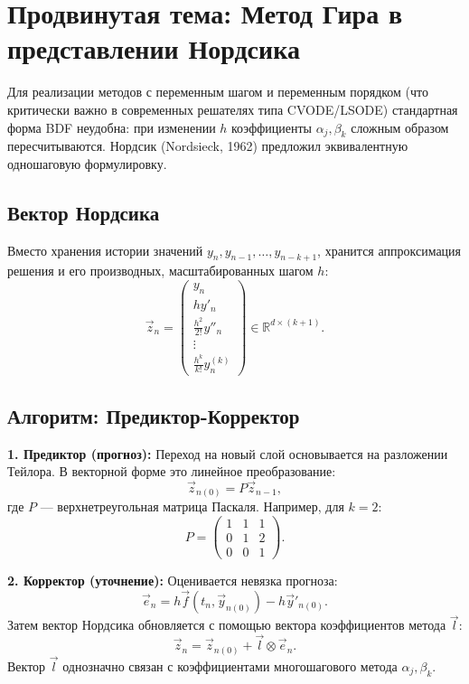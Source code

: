 \documentclass[12pt,a4paper]{article}
\begin{document}
\section{Продвинутая тема: Метод Гира в представлении Нордсика}

Для реализации методов с переменным шагом и переменным порядком (что критически важно в современных решателях типа CVODE/LSODE) стандартная форма BDF неудобна: при изменении $h$ коэффициенты $\alpha_j, \beta_k$ сложным образом пересчитываются. Нордсик (Nordsieck, 1962) предложил эквивалентную одношаговую формулировку.

\subsection{Вектор Нордсика}
Вместо хранения истории значений $y_n, y_{n-1}, \dots, y_{n-k+1}$, хранится аппроксимация решения и его производных, масштабированных шагом $h$:
\begin{equation}
    \vec{z}_n = \begin{pmatrix} y_n \\ h y'_n \\ \frac{h^2}{2!} y''_n \\ \vdots \\ \frac{h^k}{k!} y^{(k)}_n \end{pmatrix} \in \mathbb{R}^{d \times (k+1)}.
\end{equation}

\subsection{Алгоритм: Предиктор-Корректор}
\textbf{1. Предиктор (прогноз):} Переход на новый слой основывается на разложении Тейлора. В векторной форме это линейное преобразование:
\[
    \vec{z}_{n(0)} = P \vec{z}_{n-1},
\]
где $P$ — верхнетреугольная матрица Паскаля. Например, для $k=2$:
\[
    P = \begin{pmatrix} 1 & 1 & 1 \\ 0 & 1 & 2 \\ 0 & 0 & 1 \end{pmatrix}.
\]

\textbf{2. Корректор (уточнение):} Оценивается невязка прогноза:
\[
    \vec{e}_n = h \vec{f}(t_n, \vec{y}_{n(0)}) - h \vec{y}'_{n(0)}.
\]
Затем вектор Нордсика обновляется с помощью вектора коэффициентов метода $\vec{l}$:
\[
    \vec{z}_n = \vec{z}_{n(0)} + \vec{l} \otimes \vec{e}_n.
\]
Вектор $\vec{l}$ однозначно связан с коэффициентами многошагового метода $\alpha_j, \beta_k$.
\end{document}
